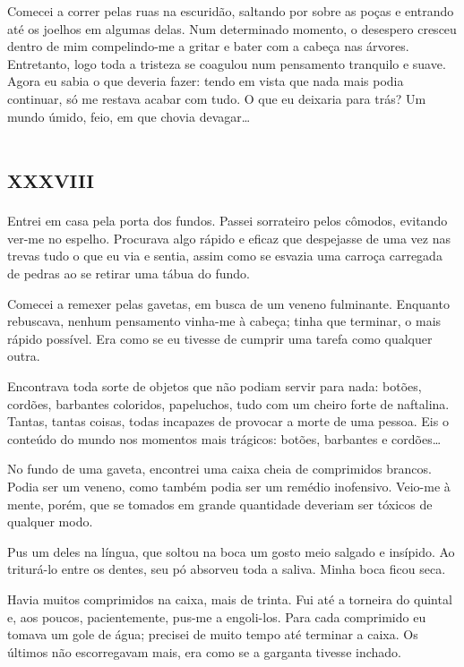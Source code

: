 Comecei a correr pelas ruas na escuridão, saltando por sobre as poças e entrando até os joelhos em algumas delas.
Num determinado momento, o desespero cresceu dentro de mim compelindo-me a gritar e bater com a cabeça nas árvores. Entretanto, logo toda a tristeza se coagulou num pensamento tranquilo e suave. Agora eu sabia o que deveria fazer: tendo em vista que nada mais podia continuar, só me restava acabar com tudo. O que eu deixaria para trás? Um mundo úmido, feio, em que chovia devagar\ldots{}


\chapter*{\huge\centering\textsc{xxxviii}}

Entrei em casa pela porta dos fundos. Passei sorrateiro pelos cômodos, evitando ver-me no espelho. Procurava algo rápido e eficaz que despejasse de uma vez nas trevas tudo o que eu via e sentia, assim como se esvazia uma carroça carregada de pedras ao se retirar uma tábua do fundo.

Comecei a remexer pelas gavetas, em busca de um veneno fulminante. Enquanto rebuscava, nenhum pensamento vinha-me à cabeça; tinha que terminar, o mais rápido possível. Era como se eu tivesse de cumprir uma tarefa como qualquer outra. 

Encontrava toda sorte de objetos que não podiam servir para nada: botões, cordões, barbantes coloridos, papeluchos, tudo com um cheiro forte de naftalina. Tantas, tantas coisas, todas incapazes de provocar a morte de uma pessoa. Eis o conteúdo do mundo nos momentos mais trágicos: botões, barbantes e cordões\ldots{}

No fundo de uma gaveta, encontrei uma caixa cheia de comprimidos brancos. Podia ser um veneno, como também podia ser um remédio inofensivo. Veio-me à mente, porém, que se tomados em grande quantidade deveriam ser tóxicos de qualquer modo.

Pus um deles na língua, que soltou na boca um gosto meio salgado e insípido. Ao triturá-lo entre os dentes, seu pó absorveu toda a saliva. Minha boca ficou seca.

Havia muitos comprimidos na caixa, mais de trinta. Fui até a torneira do quintal e, aos poucos, pacientemente, pus-me a engoli-los.
Para cada comprimido eu tomava um gole de água; precisei de muito tempo até terminar a caixa. Os últimos não escorregavam mais, era como se a garganta tivesse inchado.

